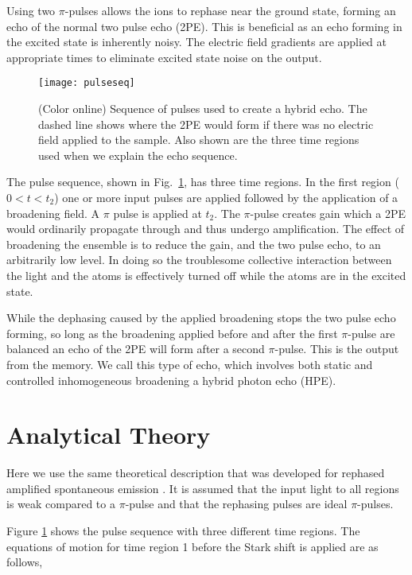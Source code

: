                                                                                                                                                                                                                                                                                                                                                                                                                                                                                                                                                                                                                                                                                                                                                                                                                                                                                                                                                                                                                                                                                                                                                                                                                                                                                                                                                                                                                                                                                                                                                                                                                                                                                                                                                                                                                                                                                                                                                                                                                                                                                                                                                                                                                                                                                                                                                                                                                                                                                                                                                                                                                                                                                                                                                                                                                                                                                                                                                                                                                                                                                                                                                                                                                                                                                                                                                                                                                                                                                                                                                                                                                                                                                                                                                                                                                                                                                                                                                                                                                                                                                                                                                                                                                                                                                                                                                                                                                                                                                                                                                                                                                                                                                                                                                                                                                                                                                                                                                                                                                                                                                                                                                                                                                                                                                                                                                                                                                                                                                                                                                                                                                                                                                                                                                                                                                                                                                                                                                                                                                                                                                                                                                                                                                                                                                                                                                                                                                                                                                                                                                                                                                                                                                                                                                                                                                                                                                                                                                                                                                                                                                                                                                                                                                                                                                                                                                                                                                                                                                                                                                                                                                                                                                                                                                                                                                                                                                                                                                                                                                                                                                                                                                                                                                                                                                                                                                                                                                                                                                                                                                                                                                                                                                                                                                                                                                                                                                                                                                                                                                                                                                                                                                                                                                                                                                                                                                                                                                                                                                                                                                                                                                                                                                                                                                                                                                                                                                                                                                                                                                                                                                                                                                                                                                                                                                                                                                                                                                                                                                                                                                                                                                                                                                                                                                                                                                                                                                                                                                                                                                                                                                                                                                                                                                                                                                                                                                                                                                                                                                                                                                                                                                                                                                                                                                                                                                                                                                                                                                                                                                                                                                                                                                                                                                                                                                                                                                                                                                                                                                                                                                                                                                                                                                                                                                                                                                                                                                                                                                                                                                                                                                                                                                                                                                                                                                                                                                                                                                                                                                                                                                                                                                                                                                                                                                                                                                                                                                                                                                                                                                                                                                                                                                                                                                                                                                                                                                                                                                                                                                                                                                                                                                                                                                                                                                                                                                                                                                                                                                                                                                                                                                                                                                                                                                                                                                                                                                                                                                                                                                                                                                                                                                                                                                                                                                                                                                                                                                                                                                                                                                                                                                                                                                                                                                                                                                                                                                                                                                                                                                                                                                                                                                                                                                                                                                                                                                                                                                                                                                                                                                                                                                                                                                                                                                                                                                                                                                                                                                                                                                                                                                                                                                                                                                                                                                                                                                                                                                                                                                                                                                                                                                                                                                                                                                                                                                                                                                                                                                                                                                                                                                                                                                                                                                                                                                                                                                                                                                                                                                                                                                                                                                                                                                                                                                                                                                                                                                                                                                                                                                                                                                                                                                                                                                                                                                                                                                                                                                                                                                                                                                                                                                                                                                                                                                                                                                                                                                                                                                                                                                                                                                                                                                                                                                                                                                                                                                                                                                                                                                                                                                                                                                                                                                                                                                                                                                                                                                                                                                                                                                                                                                                                                                                                                                                                                                                                                                                                                                                                                                                                                                                                                                                                                                                                                                                                                                                                                                                                                                                                                                                                                                                                                                                                                                                                                                                                                                                                                                                                                                                                                                                                                                                                                                                                                                                                                                                                                                                                                                                                                                                                                                                                                                                                                                                                                                                                                                                                                                                                                                                                                                                                                                                                                                                                                                                                                                                                                                                                                                                                                                                                                                                                                                                                                                                                                                                                                                                                                                                                                                                                                                                                                                                                                                                                                                                                                                                                                                                                                                                                                                                                                                                                                                                                                                                                                                                                                                                                                                                                                                                                                                                                                                                                                                                                                                                                                                                                                                                                                                                                                                                                                                                                                                                                                                                                                                                                                                                                                                                                                                                                                                                                                                                                                                                                                                                                                                                                                                                                                                                                                                                                                                                                                                                                                                                                                                                                                                                                                                                                                                                                                                                                                                                                                                                                                                                                                                                                                                                                                                                                                                                                                                                                                                                                                                                                                                                                                                                                                                                                                                                                                                                                                                                                                                                                                                                                                                                                                                                                                                                                                                                                                                                                                                                                                                                                                                                                                                                                                                                                                                                                                                                                                                                                                                                                                                                                                                                                                                                                                                                                                                                                                                                                                                                                                                                                                                                                                                                                                                                                                                                                                                                                                                                                                                                                                                                                                                                                                                                                                                                                                                                                                                                                                                                                                                                                                                                                                                                                                                                                                                                                                                                                                                                                                                                                                                                                                                                                                                                                                                                                                                                                                                                                                                                                                                                                                                                                                                                                                                                                                                                                                                                                                                                                                                                                                                                                                                                                                                                                                                                                                                                                                                                                                                                                                                                                                                                                                                                                                                                                                                                                                                                                                                                                                                                                                                                                                                                                                                                                                                                                                                                                                                                                                                                                                                                                                                                                                                                                                                                                                                                                                                                                                                                                                                                                                                                                                                                                                                                                                                                                                                                                                                                                                                                                                                                                                                                                                                                                                                                                                                                                                                                                                                                                                                                                                                                                                                                                                                                                                                                                                                                                                                                                                                                                                                                                                                                                                                                                                                                                                                                                                                                                                                                                                                                                                                                                                                                                                                                                                                                                                                                                                                                                                                                                                                                                                                                                                                                                                                                                                                                                                                                                                                                                                                                                                                                                                                                                                                                                                                                                                                                                                                                                                                                                                                                                                                                                                                                                                                                                                                                                                                                                                                                                                                                                                                                                                                                                                                                                                                                                                                                                                                                                                                                                                                                                                                                                                                                                                                                                                                                                                                                                                                                                                                                                                                                                                                                                                                                                                                                                                                                                                                                                                                                                                                                                                                                                                                                                                                                                                                                                                                                                                                                                                                                                                                                                                                                                                                                                                                                                                                                                                                                                                                                                                                                                                                                                                                                                                                                                                                                                                                                                                                                                                                                                                                                                                                                                                                                                                                                                                                                                                                                                                                                                                                                                                                                                                                                                                                                                                                                                                                                                                                                                                                                                                                                                                                                                                                                                                                                                                                                                                                                                                                                                                                                                                                                                                                                                                                                                                                                                                                                                                                                                                                                                                                                                                                                                                                                                                                                                                                                                                                                                                                                                                                                                                                                                                                                                                                                                                                                                                                                                                                                                                                                                                                                                                                                                                                                                                                                                                                                                                                                                                                                                                                                                                                                                                                                                                                                                                                                                                                                                                                                                                                                                                                                                                                                                                                                                                                                                                                                                                                                                                                                                                                                                                                                                                                                                                                                                                                                                                                                                                                                                                                                                                                                                                                                                                                                                                                                                                                                                                                                                                                                                                                                                                                                                                                                                                                                                                                                                                                                                                                                                                                                                                                                                                                                                                                                                                                                                                                                                                                                                                                                                                                                                                                                                                                                                                                                                                                                                                                                                                                                                                                                                                                                                                                                                                                                                                                                                                                                                                                                                                                                                                                                                                                                                                                                                                                                                                                                                                                                                                                                                                                                                                                                                                                                                                                                                                                                                                                                                                                                                                                                                                                                                                                                                                                                                                                                                                                                                                                                                                                                                                                                                                                                                                                                                                                                                                                                                                                                                                                                                                                                                                                                                                                                                                                                                                                                                                                                                    \documentclass[superscriptaddress,pra,twocolumn,showpacs,amsmath,amssymb,aps,a4paper]{revtex4}
\begin{document}
Using two $\pi$-pulses allows the ions to rephase near the ground
state, forming an echo of the normal two pulse echo (2PE). This is
beneficial as an echo forming in the excited state is inherently
noisy. The electric field gradients are applied at appropriate times
to eliminate excited state noise on the output.

\begin{figure}  \centering
  \texttt{[image: pulseseq]}
\caption{\label{fig:pulseseq} (Color online)
Sequence of pulses used to create a hybrid echo. The dashed line shows
where the 2PE would form if there was no electric field applied to the
sample. Also shown are the three time regions used when we explain
the echo sequence.
}
\end{figure}

The pulse sequence, shown in Fig.~\ref{fig:pulseseq}, has three time
regions. In the first region ($0 < t < t_2$) one or more input pulses are
applied followed by the application of a broadening field. A $\pi$
pulse is applied at $t_2$.  The $\pi$-pulse creates  gain 
which a 2PE would ordinarily propagate through and thus undergo 
amplification. The effect of broadening the ensemble is to reduce the gain, and
the two pulse echo, to an arbitrarily low level.  In doing so the 
troublesome collective interaction between the light and the atoms is
effectively turned off while the atoms are in the excited state.

While the dephasing caused by the applied broadening stops the two
pulse echo forming, so long as the broadening applied before and after the
first $\pi$-pulse are balanced an echo of the 2PE will form after a
second $\pi$-pulse. This is the output from the memory. We call this
type of echo, which involves both static and controlled inhomogeneous
broadening a hybrid photon echo (HPE).

\section{Analytical Theory}

Here we use the same theoretical description that was developed for rephased
amplified spontaneous emission \cite{ledi10}. It is assumed that the input
light to all regions is weak compared to a $\pi$-pulse and that the
rephasing pulses are ideal $\pi$-pulses.

Figure \ref{fig:pulseseq} shows the pulse sequence with three different
time regions. The equations of motion for time region 1 before the
Stark shift is applied are as follows,
\end{document}
